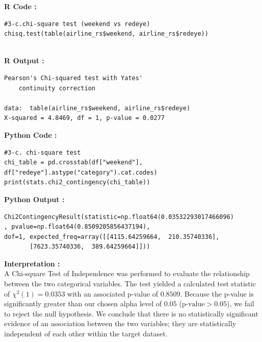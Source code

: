 \documentclass[11pt,a4paper]{article}
\begin{document}
\noindent \textbf{R Code :}
\begin{codebox}
\begin{lstlisting}[style=Rstyle]
#3-c.chi-square test (weekend vs redeye)
chisq.test(table(airline_rs$weekend, airline_rs$redeye))


\end{lstlisting}
\end{codebox}

\vspace{0.5em}
\noindent \textbf{R Output :}
\begin{verbatim}
Pearson's Chi-squared test with Yates'
	continuity correction

data:  table(airline_rs$weekend, airline_rs$redeye)
X-squared = 4.8469, df = 1, p-value = 0.0277

\end{verbatim}

\vspace{0.5em}
\noindent \textbf{Python Code :}
\begin{codebox}
\begin{lstlisting}[style=Pythonstyle]
#3-c. chi-square test
chi_table = pd.crosstab(df["weekend"], df["redeye"].astype("category").cat.codes)
print(stats.chi2_contingency(chi_table))
\end{lstlisting}
\end{codebox}

\vspace{0.5em}
\newpage
\noindent \textbf{Python Output :}

\begin{verbatim}
Chi2ContingencyResult(statistic=np.float64(0.03532293017466096)
, pvalue=np.float64(0.8509205856437194),
dof=1, expected_freq=array([[4115.64259664,  210.35740336],
       [7623.35740336,  389.64259664]]))
\end{verbatim}
\vspace{0.5em}
\noindent \textbf{Interpretation :} \\
A Chi-square Test of Independence was performed to evaluate the relationship between the two categorical variables. The test yielded a calculated test statistic of $\chi^2(1) = 0.0353$ with an associated p-value of $0.8509$. Because the p-value is significantly greater than our chosen alpha level of $0.05$ ($\text{p-value} > 0.05$), we fail to reject the null hypothesis. We conclude that there is no statistically significant evidence of an association between the two variables; they are statistically independent of each other within the target dataset.
\vspace{2.5em}
\end{document}
